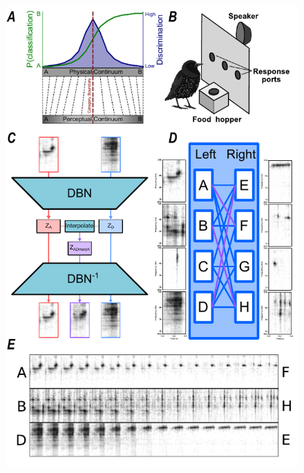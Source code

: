 \begin{figure}[tbp] 
  \centering
  \includegraphics[width=114mm]{figures/fig01_task_outline.pdf}
  \label{fig:outline}
\end{figure}